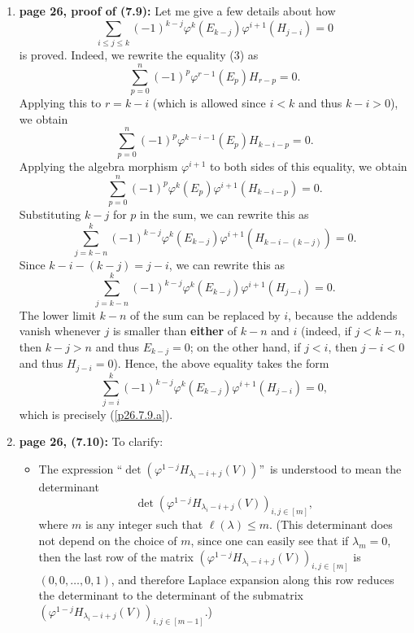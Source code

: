 \documentclass[numbers=enddot,12pt,final,onecolumn,notitlepage]{scrartcl}%
\theoremstyle{definition}
\let\sumnonlimits\sum
\renewcommand{\sum}{\sumnonlimits\limits}
\begin{document}
\begin{enumerate}
\item \textbf{page 26, proof of (7.9):} Let me give a few details about how
\begin{equation}
\sum_{i\leq j\leq k}\left(  -1\right)  ^{k-j}\varphi^{k}\left(  E_{k-j}%
\right)  \varphi^{i+1}\left(  H_{j-i}\right)  =0 \label{p26.7.9.a}%
\end{equation}
is proved. Indeed, we rewrite the equality (3) as
\[
\sum_{p=0}^{n}\left(  -1\right)  ^{p}\varphi^{r-1}\left(  E_{p}\right)
H_{r-p}=0.
\]
Applying this to $r=k-i$ (which is allowed since $i<k$ and thus $k-i>0$), we
obtain%
\[
\sum_{p=0}^{n}\left(  -1\right)  ^{p}\varphi^{k-i-1}\left(  E_{p}\right)
H_{k-i-p}=0.
\]
Applying the algebra morphism $\varphi^{i+1}$ to both sides of this equality,
we obtain%
\[
\sum_{p=0}^{n}\left(  -1\right)  ^{p}\varphi^{k}\left(  E_{p}\right)
\varphi^{i+1}\left(  H_{k-i-p}\right)  =0.
\]
Substituting $k-j$ for $p$ in the sum, we can rewrite this as%
\[
\sum_{j=k-n}^{k}\left(  -1\right)  ^{k-j}\varphi^{k}\left(  E_{k-j}\right)
\varphi^{i+1}\left(  H_{k-i-\left(  k-j\right)  }\right)  =0.
\]
Since $k-i-\left(  k-j\right)  =j-i$, we can rewrite this as%
\[
\sum_{j=k-n}^{k}\left(  -1\right)  ^{k-j}\varphi^{k}\left(  E_{k-j}\right)
\varphi^{i+1}\left(  H_{j-i}\right)  =0.
\]
The lower limit $k-n$ of the sum can be replaced by $i$, because the addends
vanish whenever $j$ is smaller than \textbf{either} of $k-n$ and $i$ (indeed,
if $j<k-n$, then $k-j>n$ and thus $E_{k-j}=0$; on the other hand, if $j<i$,
then $j-i<0$ and thus $H_{j-i}=0$). Hence, the above equality takes the form%
\[
\sum_{j=i}^{k}\left(  -1\right)  ^{k-j}\varphi^{k}\left(  E_{k-j}\right)
\varphi^{i+1}\left(  H_{j-i}\right)  =0,
\]
which is precisely (\ref{p26.7.9.a}).

\item \textbf{page 26, (7.10):} To clarify:

\begin{itemize}
\item The expression \textquotedblleft$\det\left(  \varphi^{1-j}H_{\lambda
_{i}-i+j}\left(  V\right)  \right)  $\textquotedblright\ is understood to mean
the determinant%
\[
\det\left(  \varphi^{1-j}H_{\lambda_{i}-i+j}\left(  V\right)  \right)
_{i,j\in\left[  m\right]  },
\]
where $m$ is any integer such that $\ell\left(  \lambda\right)  \leq m$. (This
determinant does not depend on the choice of $m$, since one can easily see
that if $\lambda_{m}=0$, then the last row of the matrix $\left(
\varphi^{1-j}H_{\lambda_{i}-i+j}\left(  V\right)  \right)  _{i,j\in\left[
m\right]  }$ is $\left(  0,0,\ldots,0,1\right)  $, and therefore Laplace
expansion along this row reduces the determinant to the determinant of the
submatrix $\left(  \varphi^{1-j}H_{\lambda_{i}-i+j}\left(  V\right)  \right)
_{i,j\in\left[  m-1\right]  }$.)


\end{itemize}
\end{enumerate}
\end{document}
